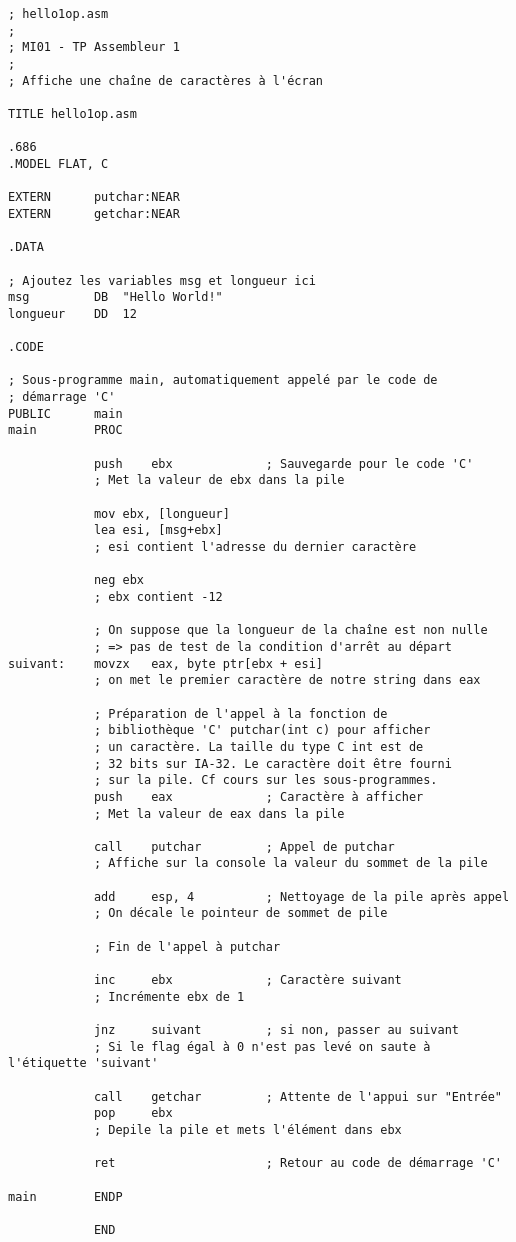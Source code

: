 \assembly
\begin{lstlisting}
; hello1op.asm
;
; MI01 - TP Assembleur 1
;
; Affiche une chaîne de caractères à l'écran

TITLE hello1op.asm

.686
.MODEL FLAT, C

EXTERN      putchar:NEAR
EXTERN      getchar:NEAR

.DATA

; Ajoutez les variables msg et longueur ici
msg			DB	"Hello World!"
longueur	DD	12

.CODE

; Sous-programme main, automatiquement appelé par le code de
; démarrage 'C'
PUBLIC      main
main        PROC

            push    ebx             ; Sauvegarde pour le code 'C'
			; Met la valeur de ebx dans la pile
			
			mov ebx, [longueur]
			lea esi, [msg+ebx]
			; esi contient l'adresse du dernier caractère
			
            neg ebx
            ; ebx contient -12
            
            ; On suppose que la longueur de la chaîne est non nulle
            ; => pas de test de la condition d'arrêt au départ
suivant:    movzx   eax, byte ptr[ebx + esi]
			; on met le premier caractère de notre string dans eax

            ; Préparation de l'appel à la fonction de
            ; bibliothèque 'C' putchar(int c) pour afficher
            ; un caractère. La taille du type C int est de
            ; 32 bits sur IA-32. Le caractère doit être fourni
            ; sur la pile. Cf cours sur les sous-programmes.
            push    eax             ; Caractère à afficher
            ; Met la valeur de eax dans la pile
            
            call    putchar         ; Appel de putchar
            ; Affiche sur la console la valeur du sommet de la pile
            
            add     esp, 4          ; Nettoyage de la pile après appel
            ; On décale le pointeur de sommet de pile
            
            ; Fin de l'appel à putchar

            inc     ebx             ; Caractère suivant
            ; Incrémente ebx de 1
            
            jnz     suivant         ; si non, passer au suivant
            ; Si le flag égal à 0 n'est pas levé on saute à l'étiquette 'suivant'

            call    getchar         ; Attente de l'appui sur "Entrée"
            pop     ebx
            ; Depile la pile et mets l'élément dans ebx

            ret                     ; Retour au code de démarrage 'C'

main        ENDP

            END
\end{lstlisting}

